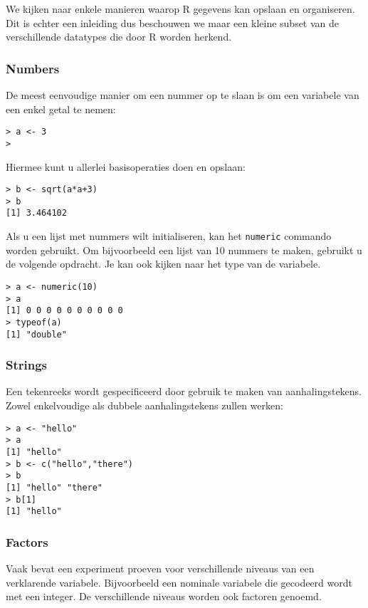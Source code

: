 We kijken naar enkele manieren waarop R gegevens kan opslaan en organiseren. Dit is echter een inleiding dus beschouwen we maar een kleine subset van de verschillende datatypes die door R worden herkend. 

\subsubsection{Numbers}

De meest eenvoudige manier om een nummer op te slaan is om een variabele van een enkel getal te nemen:

\begin{lstlisting}
> a <- 3
>
\end{lstlisting}

Hiermee kunt u allerlei basisoperaties doen en opslaan:

\begin{lstlisting}
> b <- sqrt(a*a+3)
> b
[1] 3.464102
\end{lstlisting}

Als u een lijst met nummers wilt initialiseren, kan het \texttt{numeric} commando worden gebruikt. Om bijvoorbeeld een lijst van 10 nummers te maken, gebruikt u de volgende opdracht. Je kan ook kijken naar het type van de variabele.

\begin{lstlisting}
> a <- numeric(10)
> a
[1] 0 0 0 0 0 0 0 0 0 0
> typeof(a)
[1] "double"
\end{lstlisting}

\subsubsection{Strings}

Een tekenreeks wordt gespecificeerd door gebruik te maken van aanhalingstekens. Zowel enkelvoudige als dubbele aanhalingstekens zullen werken:

\begin{lstlisting}
> a <- "hello"
> a
[1] "hello"
> b <- c("hello","there")
> b
[1] "hello" "there"
> b[1]
[1] "hello"
\end{lstlisting}

\subsubsection{Factors}

Vaak bevat een experiment proeven voor verschillende niveaus van een  verklarende variabele. Bijvoorbeeld een nominale variabele die gecodeerd wordt met een integer. De verschillende niveaus worden ook factoren genoemd.

